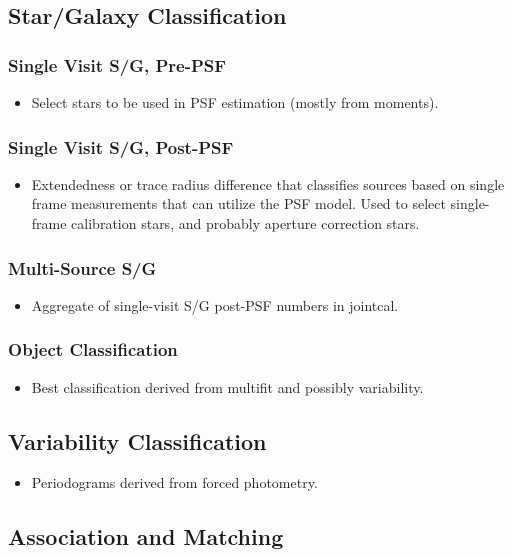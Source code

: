 \subsection{Star/Galaxy Classification}
\subsubsection{Single Visit S/G, Pre-PSF}
\begin{itemize}
\item Select stars to be used in PSF estimation (mostly from moments).
\end{itemize}
\subsubsection{Single Visit S/G, Post-PSF}
\begin{itemize}
\item Extendedness or trace radius difference that classifies sources based on single frame measurements that can utilize the PSF model.  Used to select single-frame calibration stars, and probably aperture correction stars.
\end{itemize}
\subsubsection{Multi-Source S/G}
\begin{itemize}
\item Aggregate of single-visit S/G post-PSF numbers in jointcal.
\end{itemize}
\subsubsection{Object Classification}
\begin{itemize}
\item Best classification derived from multifit and possibly variability.
\end{itemize}

\subsection{Variability Classification}
\begin{itemize}
\item Periodograms derived from forced photometry.
\end{itemize}

\subsection{Association and Matching}
